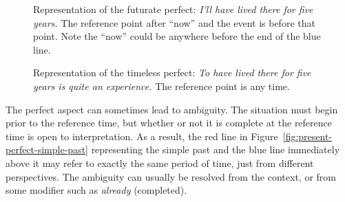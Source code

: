 \begin{figure}[ht]
    \centering
    \caption{Representation of the futurate perfect: \textit{I'll have lived there for five years.} The reference point after ``now'' and the event is before that point. Note the ``now'' could be anywhere before the end of the blue line.}
    \label{fig:futurate-perfect}
\end{figure}

\begin{figure}[ht]
    \centering
    \caption{Representation of the timeless perfect: \textit{To have lived there for five years is quite an experience.} The reference point is any time.}
    \label{fig:timeless-perfect}
\end{figure}

The perfect aspect can sometimes lead to ambiguity. The situation must begin prior to the reference time, but whether or not it is complete at the reference time is open to interpretation. As a result, the red line in Figure~\ref{fig:present-perfect-simple-past} representing the simple past and the blue line immediately above it may refer to exactly the same period of time, just from different perspectives. The ambiguity can usually be resolved from the context, or from some modifier such as \textit{already} (completed).

